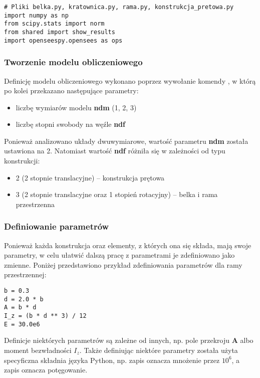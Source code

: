 \begin{lstlisting}
# Pliki belka.py, kratownica.py, rama.py, konstrukcja_pretowa.py
import numpy as np
from scipy.stats import norm
from shared import show_results
import openseespy.opensees as ops
\end{lstlisting}

\subsubsection{Tworzenie modelu obliczeniowego}

Definicję modelu obliczeniowego wykonano poprzez wywołanie komendy
, w którą po kolei przekazano następujące parametry:

\begin{itemize}
    \item liczbę wymiarów modelu \textbf{ndm} (1, 2, 3)
    \item liczbę stopni swobody na węźle \textbf{ndf}
\end{itemize}

Ponieważ analizowano układy dwuwymiarowe, wartość parametru \textbf{ndm} została ustawiona na 2.
Natomiast wartość \textbf{ndf} różniła się w zależności od typu konstrukcji:

\begin{itemize}
    \item 2 (2 stopnie translacyjne) – konstrukcja prętowa
    \item 3 (2 stopnie translacyjne oraz 1 stopień rotacyjny) – belka i rama przestrzenna
\end{itemize}

\subsubsection{Definiowanie parametrów}

Ponieważ każda konstrukcja oraz elementy, z których ona się składa, mają swoje parametry, w celu ułatwić dalszą pracę z parametrami
je zdefiniowano jako zmienne.
Poniżej przedstawiono przykład zdefiniowania parametrów dla ramy przestrzennej:

\begin{lstlisting}
b = 0.3
d = 2.0 * b
A = b * d
I_z = (b * d ** 3) / 12
E = 30.0e6
\end{lstlisting}

Definicje niektórych parametrów są zależne od innych, np. pole przekroju \textbf{A} albo moment bezwładności \textbf{$I_z$}.
Także definiując niektóre parametry została użyta specyficzna składnia języka Python, np. zapis  oznacza mnożenie
przez \textbf{$10^6$}, a zapis \inlinecode{**} oznacza potęgowanie.

